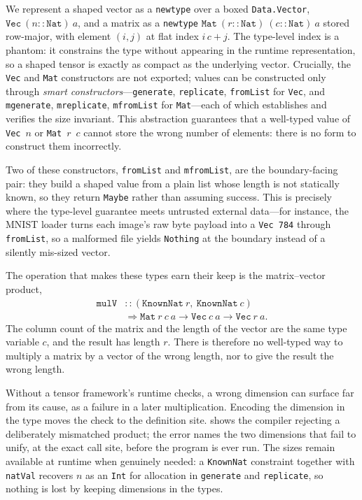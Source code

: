 \documentclass[sigconf,nonacm]{acmart}
\begin{document}
We represent a shaped vector as a \texttt{newtype} over a boxed
\texttt{Data.Vector}, \(\mathtt{Vec}\ (n :: \mathtt{Nat})\ a\), and a matrix as a
\texttt{newtype} \(\mathtt{Mat}\ (r :: \mathtt{Nat})\ (c :: \mathtt{Nat})\ a\)
stored row-major, with element \((i, j)\) at flat index \(i\,c + j\). The
type-level index is a phantom: it constrains the type without appearing in the
runtime representation, so a shaped tensor is exactly as compact as the
underlying vector. Crucially, the \texttt{Vec} and \texttt{Mat} constructors are
not exported; values can be constructed only through \emph{smart constructors}---\texttt{generate}, \texttt{replicate}, \texttt{fromList} for \texttt{Vec}, and \texttt{mgenerate}, \texttt{mreplicate}, \texttt{mfromList} for \texttt{Mat}---each of which establishes and verifies the size invariant. This abstraction guarantees that a well-typed value of \texttt{Vec}~\(n\) or \texttt{Mat}~\(r\)~\(c\) cannot store the wrong number of elements: there is no form to construct them incorrectly.

Two of these constructors, \texttt{fromList} and \texttt{mfromList}, are the boundary-facing pair: they build a shaped value from a plain list whose length is not statically known, so they return \texttt{Maybe} rather than assuming success. This is precisely where the type-level guarantee meets untrusted external data---for instance, the MNIST loader turns each image's raw byte payload into a \texttt{Vec 784} through \texttt{fromList}, so a malformed file yields \texttt{Nothing} at the boundary instead of a silently mis-sized vector.

The operation that makes these types earn their keep is the
matrix--vector product,
\[
  \begin{aligned}
    \mathtt{mulV} &:: (\mathtt{KnownNat}\ r,\ \mathtt{KnownNat}\ c) \\
      &\Rightarrow \mathtt{Mat}\ r\ c\ a \to \mathtt{Vec}\ c\ a \to \mathtt{Vec}\ r\ a.
  \end{aligned}
\]
The column count of the matrix and the length of the vector are the same type
variable \(c\), and the result has length \(r\). There is therefore no
well-typed way to multiply a matrix by a vector of the wrong length, nor to give
the result the wrong length.

Without a tensor framework's runtime checks, a wrong dimension can surface far
from its cause, as a failure in a later multiplication. Encoding the dimension
in the type moves the check to the definition site.
 shows the compiler rejecting a deliberately mismatched
product; the error names the two dimensions that fail to unify, at the exact
call site, before the program is ever run. The sizes remain available at runtime
when genuinely needed: a \texttt{KnownNat} constraint together with
\texttt{natVal} recovers \(n\) as an \texttt{Int} for allocation in
\texttt{generate} and \texttt{replicate}, so nothing is lost by keeping
dimensions in the types.
\end{document}
